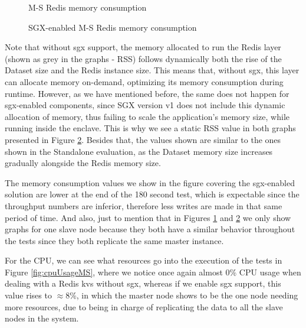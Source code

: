 \begin{figure}[htbp]
	\centering
	\caption{M-S Redis memory consumption}
	\label{fig:noSgxMemoryConsumption}
\end{figure}

\begin{figure}[htbp]
	\centering
	\caption{SGX-enabled M-S Redis memory consumption}
	\label{fig:sgxMemoryConsumption}
\end{figure}

Note that without \gls{sgx} support, the memory allocated to run the Redis layer (shown as grey in the graphs - RSS) follows dynamically both the rise of the Dataset size and the Redis instance size. This means that, without \gls{sgx}, this layer can allocate memory on-demand, optimizing its memory consumption during runtime. However, as we have mentioned before, the same does not happen for \gls{sgx}-enabled components, since SGX version v1 does not include this dynamic allocation of memory, thus failing to scale the application's memory size, while running inside the enclave. This is why we see a static RSS value in both graphs presented in Figure \ref{fig:sgxMemoryConsumption}. Besides that, the values shown are similar to the ones shown in the Standalone evaluation, as the Dataset memory size increases gradually alongside the Redis memory size. 

The memory consumption values we show in the figure covering the \gls{sgx}-enabled solution are lower at the end of the 180 second test, which is expectable since the throughput numbers are inferior, therefore less writes are made in that same period of time. And also, just to mention that in Figures \ref{fig:noSgxMemoryConsumption} and \ref{fig:sgxMemoryConsumption} we only show graphs for one slave node because they both have a similar behavior throughout the tests since they both replicate the same master instance.

For the CPU, we can see what resources go into the execution of the tests in Figure \ref{fig:cpuUsageMS}, where we notice once again almost 0\% CPU usage when dealing with a Redis \gls{kvs} without \gls{sgx}, whereas if we enable \gls{sgx} support, this value rises to $\approx$8\%, in which the master node shows to be the one node needing more resources, due to being in charge of replicating the data to all the slave nodes in the system.


